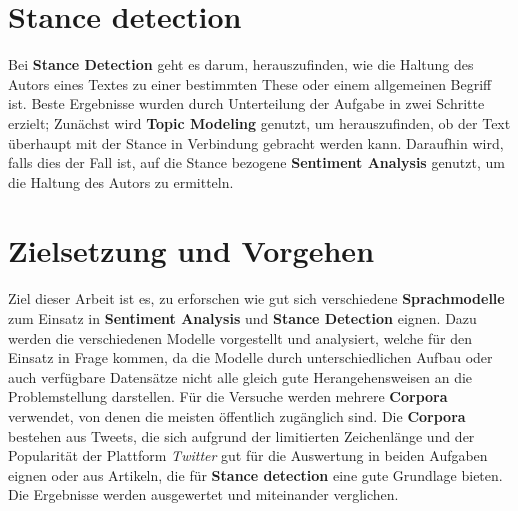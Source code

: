 \section{Stance detection}
Bei \textbf{Stance Detection} geht es darum, herauszufinden, wie die Haltung des Autors eines Textes zu einer bestimmten These oder einem allgemeinen Begriff ist. Beste Ergebnisse wurden durch Unterteilung der Aufgabe in zwei Schritte erzielt; Zun\"achst wird \textbf{Topic Modeling} genutzt, um herauszufinden, ob der Text \"uberhaupt mit der Stance in Verbindung gebracht werden kann. Daraufhin wird, falls dies der Fall ist, auf die Stance bezogene \textbf{Sentiment Analysis} genutzt, um die Haltung des Autors zu ermitteln.


\section{Zielsetzung und Vorgehen}
Ziel dieser Arbeit ist es, zu erforschen wie gut sich verschiedene \textbf{Sprachmodelle} zum Einsatz in \textbf{Sentiment Analysis} und \textbf{Stance Detection} eignen.
Dazu werden die verschiedenen Modelle vorgestellt und analysiert, welche f\"ur den Einsatz in Frage kommen, da die Modelle durch unterschiedlichen Aufbau oder auch verf\"ugbare Datens\"atze nicht alle gleich gute Herangehensweisen an die Problemstellung darstellen.
F\"ur die Versuche werden mehrere \textbf{Corpora} verwendet, von denen die meisten \"offentlich zug\"anglich sind. Die  \textbf{Corpora} bestehen aus Tweets, die sich aufgrund der limitierten Zeichenl\"ange und der Popularit\"at  der Plattform \textit{Twitter} gut f\"ur die Auswertung in beiden Aufgaben eignen oder aus Artikeln, die f\"ur \textbf{Stance detection} eine gute Grundlage bieten.
Die Ergebnisse werden ausgewertet und miteinander verglichen.




